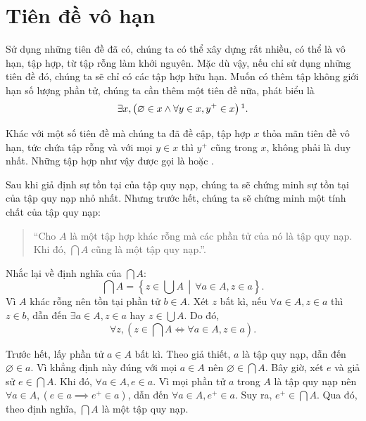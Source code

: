 \section{Tiên đề vô hạn}

Sử dụng những tiên đề đã có, chúng ta có thể xây dựng rất nhiều, có thể là vô hạn, tập hợp, từ tập rỗng làm khởi nguyên. Mặc dù vậy, nếu chỉ sử dụng những tiên đề đó, chúng ta sẽ chỉ có các tập hợp hữu hạn. Muốn có thêm tập không giới hạn số lượng phần tử, chúng ta cần thêm một tiên đề nữa, phát biểu là 
\begin{equation*}
   \exists x, \left(\varnothing \in x \land \forall y \in x, y^+ \in x\right)\footnotemark.
\end{equation*}

Khác với một số tiên đề mà chúng ta đã đề cập, tập hợp $x$ thỏa mãn tiên đề vô hạn, tức chứa tập rỗng và với mọi $y \in x$ thì $y^+$ cũng trong $x$, không phải là duy nhất. Những tập hợp như vậy được gọi là  hoặc . 

Sau khi giả định sự tồn tại của tập quy nạp, chúng ta sẽ chứng minh sự tồn tại của tập quy nạp nhỏ nhất. Nhưng trước hết, chúng ta sẽ chứng minh một tính chất của tập quy nạp:
\begin{quotation}
   ``Cho $A$ là một tập hợp khác rỗng mà các phần tử của nó là tập quy nạp. Khi đó, $\bigcap A$ cũng là một tập quy nạp.''.
\end{quotation}
Nhắc lại về định nghĩa của $\bigcap A$: \begin{equation*}
   \bigcap A = \left\{z \in \bigcup A\,\middle|\,\forall a \in A, z \in a\right\}.
\end{equation*}
Vì $A$ khác rỗng nên tồn tại phần tử $b \in A$. Xét $z$ bất kì, nếu $\forall a \in A, z \in a$ thì $z \in b$, dẫn đến $\exists a \in A, z \in a$ hay $z \in \bigcup A$. Do đó,
\begin{equation*}
   \forall z, \left(z \in \bigcap A \iff \forall a \in A, z \in a\right).
\end{equation*}

Trước hết, lấy phần tử $a \in A$ bất kì. Theo giả thiết, $a$ là tập quy nạp, dẫn đến $\varnothing \in a$. Vì khẳng định này đúng với mọi $a \in A$ nên $\varnothing \in \bigcap A$. Bây giờ, xét $e$ và giả sử $e \in \bigcap A$. Khi đó, $\forall a \in A, e \in a$. Vì mọi phần tử $a$ trong $A$ là tập quy nạp nên $\forall a \in A, \left(e \in a \implies e^+ \in a\right)$, dẫn đến $\forall a \in A, e^+ \in a$. Suy ra, $e^+ \in \bigcap A$. Qua đó, theo định nghĩa, $\bigcap A$ là một tập quy nạp.

